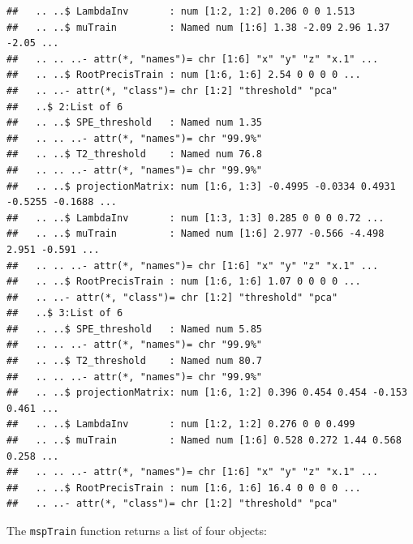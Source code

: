 \documentclass{report}\usepackage[]{graphicx}\usepackage[]{color}
\makeatletter
\newenvironment{kframe}{%
 \def\at@end@of@kframe{}%
 \ifinner\ifhmode%
  \def\at@end@of@kframe{\end{minipage}}%
  \begin{minipage}{\columnwidth}%
 \fi\fi%
 \def\FrameCommand##1{\hskip\@totalleftmargin \hskip-\fboxsep
 \colorbox{shadecolor}{##1}\hskip-\fboxsep
     \hskip-\linewidth \hskip-\@totalleftmargin \hskip\columnwidth}%
 \MakeFramed {\advance\hsize-\width
   \@totalleftmargin\z@ \linewidth\hsize
   \@setminipage}}%
 {\par\unskip\endMakeFramed%
 \at@end@of@kframe}
\newenvironment{knitrout}{}{} %
\makeatother
\begin{document}
\begin{knitrout}
\begin{kframe}
\begin{verbatim}
##   .. ..$ LambdaInv       : num [1:2, 1:2] 0.206 0 0 1.513
##   .. ..$ muTrain         : Named num [1:6] 1.38 -2.09 2.96 1.37 -2.05 ...
##   .. .. ..- attr(*, "names")= chr [1:6] "x" "y" "z" "x.1" ...
##   .. ..$ RootPrecisTrain : num [1:6, 1:6] 2.54 0 0 0 0 ...
##   .. ..- attr(*, "class")= chr [1:2] "threshold" "pca"
##   ..$ 2:List of 6
##   .. ..$ SPE_threshold   : Named num 1.35
##   .. .. ..- attr(*, "names")= chr "99.9%"
##   .. ..$ T2_threshold    : Named num 76.8
##   .. .. ..- attr(*, "names")= chr "99.9%"
##   .. ..$ projectionMatrix: num [1:6, 1:3] -0.4995 -0.0334 0.4931 -0.5255 -0.1688 ...
##   .. ..$ LambdaInv       : num [1:3, 1:3] 0.285 0 0 0 0.72 ...
##   .. ..$ muTrain         : Named num [1:6] 2.977 -0.566 -4.498 2.951 -0.591 ...
##   .. .. ..- attr(*, "names")= chr [1:6] "x" "y" "z" "x.1" ...
##   .. ..$ RootPrecisTrain : num [1:6, 1:6] 1.07 0 0 0 0 ...
##   .. ..- attr(*, "class")= chr [1:2] "threshold" "pca"
##   ..$ 3:List of 6
##   .. ..$ SPE_threshold   : Named num 5.85
##   .. .. ..- attr(*, "names")= chr "99.9%"
##   .. ..$ T2_threshold    : Named num 80.7
##   .. .. ..- attr(*, "names")= chr "99.9%"
##   .. ..$ projectionMatrix: num [1:6, 1:2] 0.396 0.454 0.454 -0.153 0.461 ...
##   .. ..$ LambdaInv       : num [1:2, 1:2] 0.276 0 0 0.499
##   .. ..$ muTrain         : Named num [1:6] 0.528 0.272 1.44 0.568 0.258 ...
##   .. .. ..- attr(*, "names")= chr [1:6] "x" "y" "z" "x.1" ...
##   .. ..$ RootPrecisTrain : num [1:6, 1:6] 16.4 0 0 0 0 ...
##   .. ..- attr(*, "class")= chr [1:2] "threshold" "pca"
\end{verbatim}
\end{kframe}
\end{knitrout}
The \texttt{mspTrain} function returns a list of four objects:
\end{document}
